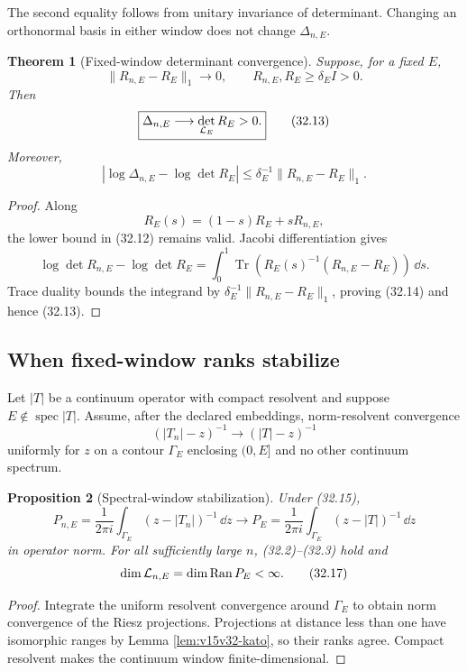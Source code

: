 \documentclass[11pt]{article}
\newtheorem{theorem}{Theorem}[section]
\newtheorem{proposition}[theorem]{Proposition}
\theoremstyle{remark}
\begin{document}
The second equality follows from unitary invariance of determinant.
Changing an orthonormal basis in either window does not change
\(\Delta_{n,E}\).

\begin{theorem}[Fixed-window determinant convergence]
\label{thm:v15v32-fixed}
Suppose, for a fixed \(E\),
\[
 \|R_{n,E}-R_E\|_1\longrightarrow0,\qquad
 R_{n,E},R_E\ge\delta_EI>0.                                \tag{32.12}
\]
Then
\[
 \boxed{
 \Delta_{n,E}\longrightarrow
 \det_{{\cal L}_E}R_E>0.}                                  \tag{32.13}
\]
Moreover,
\[
 |\log\Delta_{n,E}-\log\det R_E|
 \le
 \delta_E^{-1}\|R_{n,E}-R_E\|_1.                           \tag{32.14}
\]
\end{theorem}

\begin{proof}
Along
\[
 R_E(s)=(1-s)R_E+sR_{n,E},
\]
the lower bound in (32.12) remains valid.  Jacobi differentiation
gives
\[
 \log\det R_{n,E}-\log\det R_E
 =
 \int_0^1
 \operatorname{Tr}\left(
 R_E(s)^{-1}(R_{n,E}-R_E)
 \right)\,\dd s.
\]
Trace duality bounds the integrand by
\(\delta_E^{-1}\|R_{n,E}-R_E\|_1\), proving
(32.14) and hence (32.13).
\end{proof}

\subsection{When fixed-window ranks stabilize}

Let \(|T|\) be a continuum operator with compact resolvent and
suppose \(E\notin\operatorname{spec}|T|\).  Assume, after the
declared embeddings, norm-resolvent convergence
\[
 (|T_n|-z)^{-1}\longrightarrow(|T|-z)^{-1}                 \tag{32.15}
\]
uniformly for \(z\) on a contour \(\Gamma_E\) enclosing
\((0,E]\) and no other continuum spectrum.

\begin{proposition}[Spectral-window stabilization]
\label{prop:v15v32-window}
Under (32.15),
\[
 P_{n,E}
 =
 \frac{1}{2\pi i}\int_{\Gamma_E}(z-|T_n|)^{-1}\,\dd z
 \longrightarrow
 P_E
 =
 \frac{1}{2\pi i}\int_{\Gamma_E}(z-|T|)^{-1}\,\dd z        \tag{32.16}
\]
in operator norm.  For all sufficiently large \(n\), (32.2)--(32.3)
hold and
\[
 \dim{\cal L}_{n,E}=\dim\operatorname{Ran}P_E<\infty.       \tag{32.17}
\]
\end{proposition}

\begin{proof}
Integrate the uniform resolvent convergence around
\(\Gamma_E\) to obtain norm convergence of the Riesz projections.
Projections at distance less than one have isomorphic ranges by
Lemma \ref{lem:v15v32-kato}, so their ranks agree.  Compact
resolvent makes the continuum window finite-dimensional.
\end{proof}
\end{document}
